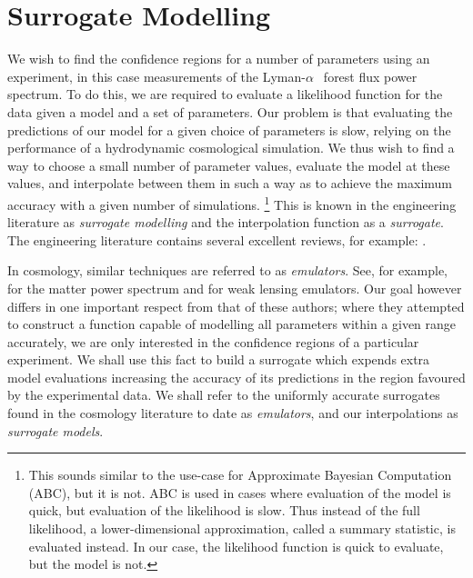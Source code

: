\documentclass[10pt, aps, prd]{revtex4-1}
\newcommand{\Lya}{Lyman-$\alpha\;$}
\begin{document}

% 

\section{Surrogate Modelling}

We wish to find the confidence regions for a number of parameters using an experiment, in this case measurements of 
the \Lya~forest flux power spectrum. To do this, we are required to evaluate a likelihood function for the data 
given a model and a set of parameters. Our problem is 
that evaluating the predictions of our model for a given choice of parameters is slow, relying on the performance 
of a hydrodynamic cosmological simulation. We thus wish to find a way to choose a small number of parameter values, 
evaluate the model at these values, and interpolate between them in such a way as to achieve the maximum accuracy 
with a given number of simulations. \footnote{This sounds similar to the use-case for Approximate Bayesian 
Computation (ABC), but it is not. ABC is used in cases where evaluation of the model is quick, but evaluation 
of the likelihood is slow. Thus instead of the full likelihood, a lower-dimensional approximation, called a 
summary statistic, is evaluated instead. In our case, the likelihood function is quick to evaluate, but the model is not.}
This is known in the engineering literature as \textit{surrogate modelling} and the interpolation function 
as a \textit{surrogate}\cite{Sacks_1989}. The engineering literature contains several excellent reviews, for example:
\cite{Queipo_2005, forrester2008engineering, forrester2009recent}.

In cosmology, similar techniques are referred to as \textit{emulators}. See, for example, \cite{Heitmann:2009} for the matter power spectrum and 
\cite{Liu:2015, Petri:2015} for weak lensing emulators. Our goal however differs in one important respect from that of these authors; where they 
attempted to construct a function capable of modelling all parameters within a given range accurately, we are only interested in the confidence 
regions of a particular experiment. We shall use this fact to build a surrogate which expends extra model evaluations increasing the 
accuracy of its predictions in the region favoured by the experimental data. We shall refer to the uniformly accurate surrogates found in 
the cosmology literature to date as \textit{emulators}, and our interpolations as \textit{surrogate models}.
\end{document}

